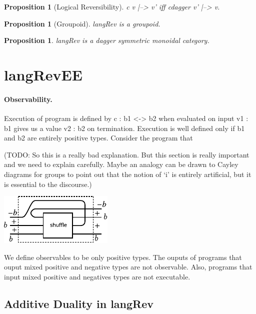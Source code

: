 \documentclass[preprint]{sigplanconf}
\newtheorem{proposition}[theorem]{Proposition}
\begin{document}
\begin{proposition}[Logical Reversibility]
\label{prop:logrev}
{{c v |--> v'}} iff {{c{dagger} v' |--> v}}.
\end{proposition}

\begin{proposition}[Groupoid]
\label{prop:groupoid}
{{langRev}} is a groupoid. 
\end{proposition}

\begin{proposition}
\label{prop:groupoid}
{{langRev}} is a dagger symmetric monoidal category. 
\end{proposition}

\section{ {{langRevEE}} }

\paragraph*{Observability.} 
Execution of program is defined by {{c : b1 <-> b2}} when evaluated on
input {{v1 : b1}} gives us a value {{v2 : b2}} on
termination. Execution is well defined only if {{b1}} and {{b2}} are
entirely positive types. Consider the program that

(TODO: So this is a really bad explanation. But this section is really
important and we need to explain carefully. Maybe an analogy can be
drawn to Cayley diagrams for groups to point out that the notion of
`i' is entirely artificial, but it is essential to the discourse.)

\begin{center}
  \includegraphics{diagrams/shuffle.pdf}
\end{center}

We define observables to be only positive types. The ouputs of
programs that ouput mixed positive and negative types are not
observable.  Also, programs that input mixed positive and negatives
types are not executable.

\subsection{Additive Duality in {{langRev}} }
\end{document}
